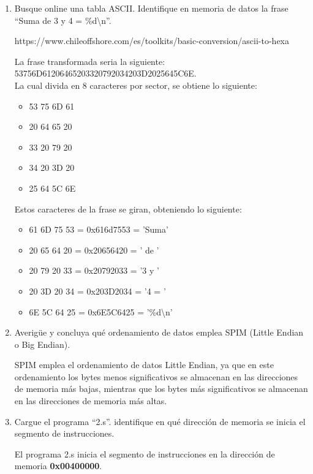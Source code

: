 \documentclass{templateNote}
\begin{document}
\begin{enumerate}[label=\alph*)]
    
    \item Busque online una tabla ASCII. Identifique en memoria de datos la frase “Suma de 3 y 4 = \%d\textbackslash n”.
    \begin{center}
        https://www.chileoffshore.com/es/toolkits/basic-conversion/ascii-to-hexa    
    \end{center}

    La frase transformada seria la siguiente: \\
    53756D61206465203320792034203D2025645C6E. \\
    La cual divida en 8 caracteres por sector, se obtiene lo siguiente:
    \begin{itemize}
        \item 53 75 6D 61 
        \item 20 64 65 20
        \item 33 20 79 20 
        \item 34 20 3D 20
        \item 25 64 5C 6E
    \end{itemize}

    Estos caracteres de la frase se giran, obteniendo lo siguiente:

    \begin{itemize}
        \item 61 6D 75 53 = 0x616d7553 = 'Suma'
        \item 20 65 64 20 = 0x20656420 = ' de '
        \item 20 79 20 33 = 0x20792033 = '3 y '
        \item 20 3D 20 34 = 0x203D2034 = '4 = '
        \item 6E 5C 64 25 = 0x6E5C6425 = '\%d\textbackslash n'
    \end{itemize}


    \item Averigüe y concluya qué ordenamiento de datos emplea SPIM (Little Endian o Big Endian).
    
    SPIM emplea el ordenamiento de datos Little Endian, ya que en este ordenamiento los bytes menos significativos se almacenan en las direcciones de memoria más bajas, mientras que los bytes más significativos se almacenan en las direcciones de memoria más altas.

    \item Cargue el programa “2.s”. identifique en qué dirección de memoria se inicia el segmento de instrucciones.

    El programa 2.s inicia el segmento de instrucciones en la dirección de memoria \textbf{0x00400000}.
    

\end{enumerate}
\end{document}
